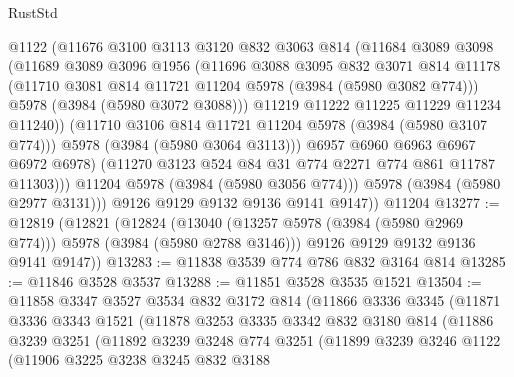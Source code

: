 \begin{lexlean}{RustStd}
\begin{coremodule}
                  @1122
                  (@11676
                    @3100
                    @3113
                    @3120
                    @832
                    @3063
                    @814
                    (@11684
                      @3089
                      @3098
                      (@11689
                        @3089
                        @3096
                        @1956
                        (@11696
                          @3088
                          @3095
                          @832
                          @3071
                          @814
                          @11178
                          (@11710 @3081 @814 @11721 @11204 @5978 (@3984 (@5980 @3082 @774)))
                          @5978
                          (@3984 (@5980 @3072 @3088)))
                        @11219
                        @11222
                        @11225
                        @11229
                        @11234
                        @11240))
                    (@11710 @3106 @814 @11721 @11204 @5978 (@3984 (@5980 @3107 @774)))
                    @5978
                    (@3984 (@5980 @3064 @3113)))
                  @6957
                  @6960
                  @6963
                  @6967
                  @6972
                  @6978)
                (@11270 @3123 @524 @84 @31 @774 @2271 @774 @861 @11787 @11303)))
            @11204
            @5978
            (@3984 (@5980 @3056 @774)))
          @5978
          (@3984 (@5980 @2977 @3131)))
        @9126
        @9129
        @9132
        @9136
        @9141
        @9147))
    @11204
@13277 := @12819
    (@12821
      (@12824
        (@13040 (@13257 @5978 (@3984 (@5980 @2969 @774))) @5978 (@3984 (@5980 @2788 @3146)))
        @9126
        @9129
        @9132
        @9136
        @9141
        @9147))
@13283 := @11838 @3539 @774 @786 @832 @3164 @814
@13285 := @11846 @3528 @3537
@13288 := @11851 @3528 @3535 @1521
@13504 := @11858
    @3347
    @3527
    @3534
    @832
    @3172
    @814
    (@11866
      @3336
      @3345
      (@11871
        @3336
        @3343
        @1521
        (@11878
          @3253
          @3335
          @3342
          @832
          @3180
          @814
          (@11886
            @3239
            @3251
            (@11892
              @3239
              @3248
              @774
              @3251
              (@11899
                @3239
                @3246
                @1122
                (@11906
                  @3225
                  @3238
                  @3245
                  @832
                  @3188

\end{coremodule}
\end{lexlean}

